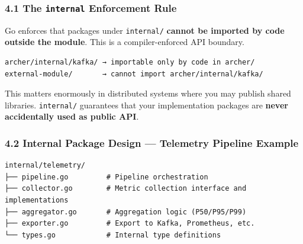 \documentclass[
]{article}
\begin{document}
\hypertarget{the-internal-enforcement-rule}{%
\subsubsection{\texorpdfstring{4.1 The \texttt{internal} Enforcement
Rule}{4.1 The internal Enforcement Rule}}\label{the-internal-enforcement-rule}}

Go enforces that packages under \texttt{internal/} \textbf{cannot be
imported by code outside the module}. This is a compiler-enforced API
boundary.

\begin{verbatim}
archer/internal/kafka/ → importable only by code in archer/
external-module/       → cannot import archer/internal/kafka/
\end{verbatim}

This matters enormously in distributed systems where you may publish
shared libraries. \texttt{internal/} guarantees that your implementation
packages are \textbf{never accidentally used as public API}.

\hypertarget{internal-package-design-telemetry-pipeline-example}{%
\subsubsection{4.2 Internal Package Design --- Telemetry Pipeline
Example}\label{internal-package-design-telemetry-pipeline-example}}

\begin{verbatim}
internal/telemetry/
├── pipeline.go         # Pipeline orchestration
├── collector.go        # Metric collection interface and implementations
├── aggregator.go       # Aggregation logic (P50/P95/P99)
├── exporter.go         # Export to Kafka, Prometheus, etc.
└── types.go            # Internal type definitions
\end{verbatim}
\end{document}
